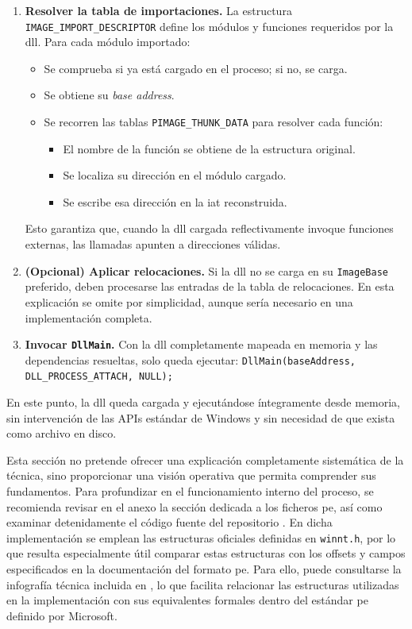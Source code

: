 \begin{enumerate}
    \item \textbf{Resolver la tabla de importaciones.}  
    La estructura \texttt{IMAGE\_IMPORT\_DESCRIPTOR} define los módulos y funciones requeridos por la \acrshort{dll}.  
    Para cada módulo importado:
    \begin{itemize}
        \item Se comprueba si ya está cargado en el proceso; si no, se carga.
        \item Se obtiene su \textit{base address}.
        \item Se recorren las tablas \texttt{PIMAGE\_THUNK\_DATA} para resolver cada función:
        \begin{itemize}
            \item El nombre de la función se obtiene de la estructura original.
            \item Se localiza su dirección en el módulo cargado.
            \item Se escribe esa dirección en la \acrshort{iat} reconstruida.
        \end{itemize}
    \end{itemize}
    Esto garantiza que, cuando la \acrshort{dll} cargada reflectivamente invoque funciones externas, las llamadas apunten a direcciones válidas.

    \item \textbf{(Opcional) Aplicar relocaciones.}  
    Si la \acrshort{dll} no se carga en su \texttt{ImageBase} preferido, deben procesarse las entradas de la tabla de relocaciones.  
    En esta explicación se omite por simplicidad, aunque sería necesario en una implementación completa.

    \item \textbf{Invocar \texttt{DllMain}.}  
    Con la \acrshort{dll} completamente mapeada en memoria y las dependencias resueltas, solo queda ejecutar:  
    \texttt{DllMain(baseAddress, DLL\_PROCESS\_ATTACH, NULL);}  
\end{enumerate}

En este punto, la \acrshort{dll} queda cargada y ejecutándose íntegramente desde memoria, sin intervención de las APIs estándar de Windows y sin necesidad de que exista como archivo en disco.

Esta sección no pretende ofrecer una explicación completamente sistemática de la técnica, sino proporcionar una visión operativa que permita comprender sus fundamentos. Para profundizar en el funcionamiento interno del proceso, se recomienda revisar en el anexo la sección dedicada a los ficheros \acrshort{pe}, así como examinar detenidamente el código fuente del repositorio \cite{walkingloader}. En dicha implementación se emplean las estructuras oficiales definidas en \texttt{winnt.h}, por lo que resulta especialmente útil comparar estas estructuras con los offsets y campos especificados en la documentación del formato \acrshort{pe}. Para ello, puede consultarse la infografía técnica incluida en \cite{peinfografia}, lo que facilita relacionar las estructuras utilizadas en la implementación con sus equivalentes formales dentro del estándar \acrshort{pe} definido por Microsoft.

